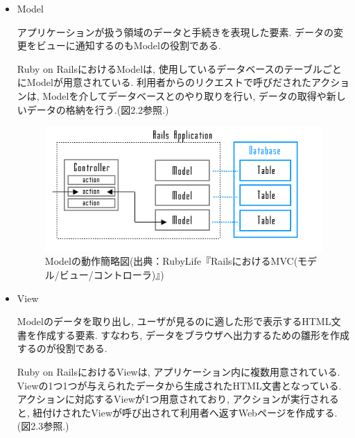 \begin{itemize}
\item Model

アプリケーションが扱う領域のデータと手続きを表現した要素.
データの変更をビューに通知するのもModelの役割である.

Ruby on RailsにおけるModelは, 使用しているデータベースのテーブルごとにModelが用意されている.
利用者からのリクエストで呼びだされたアクションは, Modelを介してデータベースとのやり取りを行い, データの取得や新しいデータの格納を行う.(図2.2参照.)

\begin{figure}
\begin{center}
\includegraphics[width=15cm]{fig/model.png}
\caption{Modelの動作簡略図(出典：RubyLife『RailsにおけるMVC(モデル/ビュー/コントローラ)』)}
\end{center}
\end{figure}

\item View

Modelのデータを取り出し, ユーザが見るのに適した形で表示するHTML文書を作成する要素.
すなわち, データをブラウザへ出力するための雛形を作成するのが役割である.

Ruby on RailsにおけるViewは, アプリケーション内に複数用意されている.
Viewの1つ1つが与えられたデータから生成されたHTML文書となっている.
アクションに対応するViewが1つ用意されており, アクションが実行されると, 紐付けされたViewが呼び出されて利用者へ返すWebページを作成する.(図2.3参照.)


\end{itemize}

